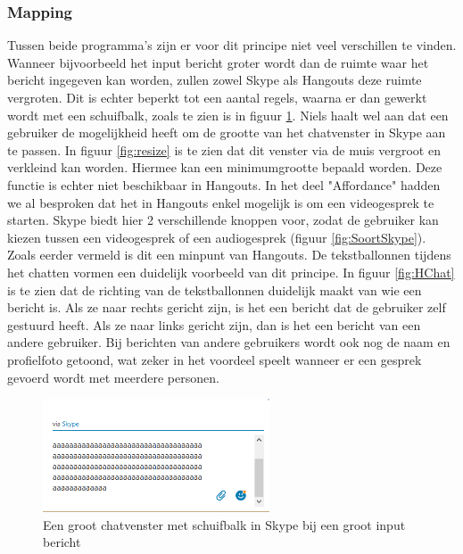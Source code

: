 \documentclass[11pt]{article}
\begin{document}
\subsubsection{Mapping}
Tussen beide programma's zijn er voor dit principe niet veel verschillen te vinden. Wanneer bijvoorbeeld het input bericht groter wordt dan de ruimte waar het bericht ingegeven kan worden, zullen zowel Skype als Hangouts deze ruimte vergroten. Dit is echter beperkt tot een aantal regels, waarna er dan gewerkt wordt met een schuifbalk, zoals te zien is in figuur \ref{fig:SkypeGrootChatvenster}. Niels haalt wel aan dat een gebruiker de mogelijkheid heeft om de grootte van het chatvenster in Skype aan te passen. In figuur \ref{fig:resize} is te zien dat dit venster via de muis vergroot en verkleind kan worden. Hiermee kan een minimumgrootte bepaald worden. Deze functie is echter niet beschikbaar in Hangouts. 
\newline
In het deel "Affordance" hadden we al besproken dat het in Hangouts enkel mogelijk is om een videogesprek te starten. Skype biedt hier 2 verschillende knoppen voor, zodat de gebruiker kan kiezen tussen een videogesprek of een audiogesprek (figuur \ref{fig:SoortSkype}). Zoals eerder vermeld is dit een minpunt van Hangouts.
\newline
De tekstballonnen tijdens het chatten vormen een duidelijk voorbeeld van dit principe. In figuur \ref{fig:HChat} is te zien dat de richting van de tekstballonnen duidelijk maakt van wie een bericht is. Als ze naar rechts gericht zijn, is het een bericht dat de gebruiker zelf gestuurd heeft. Als ze naar links gericht zijn, dan is het een bericht van een andere gebruiker. Bij berichten van andere gebruikers wordt ook nog de naam en profielfoto getoond, wat zeker in het voordeel speelt wanneer er een gesprek gevoerd wordt met meerdere personen.
\begin{figure}
	\centering
	\includegraphics[width=0.6\textwidth]{Samen_SkypeGrootChatvenster.png}
	\caption{Een groot chatvenster met schuifbalk in Skype bij een groot input bericht}
	\label{fig:SkypeGrootChatvenster}
\end{figure}
\end{document}
